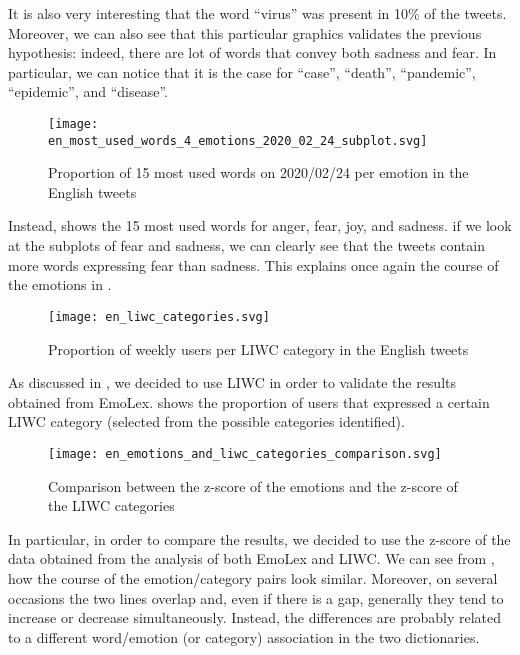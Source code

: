 It is also very interesting that the word “virus” was present in 10\% of the tweets. Moreover, we can also see that this particular graphics validates the previous hypothesis: indeed, there are lot of words that convey both sadness and fear. In particular, we can notice that it is the case for “case”, “death”, “pandemic”, “epidemic”, and “disease”.

\begin{figure}[H]
	\centering
    	\texttt{[image: en\_most\_used\_words\_4\_emotions\_2020\_02\_24\_subplot.svg]}
    	\caption{Proportion of 15 most used words on 2020/02/24 per emotion in the English tweets}
    	\label{fig:en-most-used-word-subplot-2020-02-24}
\end{figure}

Instead,  shows the 15 most used words for anger, fear, joy, and sadness. if we look at the subplots of fear and sadness, we can clearly see that the tweets contain more words expressing fear than sadness. This explains once again the course of the emotions in .

\begin{figure}[H]
	\centering
    	\texttt{[image: en\_liwc\_categories.svg]}
    	\caption{Proportion of weekly users per LIWC category in the English tweets}
    	\label{fig:en-liwc-category}
\end{figure}

As discussed in , we decided to use LIWC in order to validate the results obtained from EmoLex.  shows the proportion of users that expressed a certain LIWC category (selected from the possible categories identified).

\begin{figure}[H]
	\centering
    	\texttt{[image: en\_emotions\_and\_liwc\_categories\_comparison.svg]}
    	\caption{Comparison between the z-score of the emotions and the z-score of the LIWC categories}
    	\label{fig:en-emotions-liwc-comparison}
\end{figure}

In particular, in order to compare the results, we decided to use the z-score of the data obtained from the analysis of both EmoLex and LIWC. We can see from , how the course of the emotion/category pairs look similar. Moreover, on several occasions the two lines overlap and, even if there is a gap, generally they tend to increase or decrease simultaneously. Instead, the differences are probably related to a different word/emotion (or category) association in the two dictionaries. 

